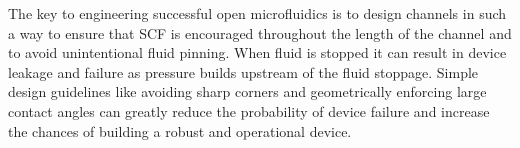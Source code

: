 The key to engineering successful open microfluidics is to design channels in such a way to ensure that SCF is encouraged throughout the length of the channel and to avoid unintentional fluid pinning. When fluid is stopped it can result in device leakage and failure as pressure builds upstream of the fluid stoppage. Simple design guidelines like avoiding sharp corners and geometrically enforcing large contact angles can greatly reduce the probability of device failure and increase the chances of building a robust and operational device. 